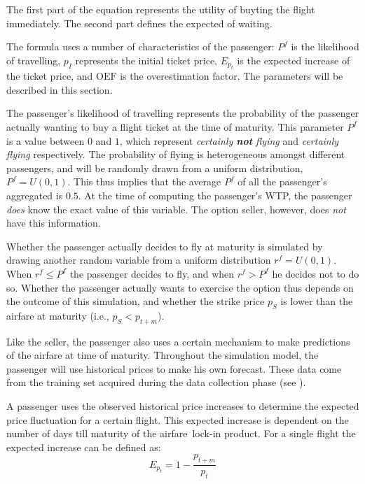 The first part of the equation represents the utility of buyting the flight immediately. The second part defines the expected of waiting.

The formula uses a number of characteristics of the passenger: $P^f$ is the likelihood of travelling, $p_I$ represents the initial ticket price, $E_{p_t}$ is the expected increase of the ticket price, and $\mbox{OEF}$ is the overestimation factor. The parameters will be described in this section.

The passenger's likelihood of travelling represents the probability of the passenger actually wanting to buy a flight ticket at the time of maturity. This parameter $P^f$ is a value between $0$ and $1$, which represent \emph{certainly \textbf{not} flying} and \emph{certainly flying} respectively. The probability of flying is heterogeneous amongst different passengers, and will be randomly drawn from a uniform distribution, $P^f = U(0,1)$. This thus implies that the average $P^f$ of all the passenger's aggregated is $0.5$. At the time of computing the passenger's WTP, the passenger \emph{does} know the exact value of this variable. The option seller, however, does \emph{not} have this information.

Whether the passenger actually decides to fly at maturity is simulated by drawing another random variable from a uniform distribution $r^f = U(0,1)$. When $r^f \le P^f$ the passenger decides to fly, and when $r^f > P^f$ he decides not to do so. Whether the passenger actually wants to exercise the option thus depends on the outcome of this simulation, and whether the strike price $p_S$ is lower than the airfare at maturity (i.e., $p_S < p_{t+m}$).

Like the seller, the passenger also uses a certain mechanism to make predictions of the airfare at time of maturity. Throughout the simulation model, the passenger will use historical prices to make his own forecast. These data come from the training set acquired during the data collection phase (see ).

A passenger uses the observed historical price increases to determine the expected price fluctuation for a certain flight. This expected increase is dependent on the number of days till maturity of the airfare~lock-in product. For a single flight the expected increase can be defined as:
$$E_{p_t} = 1 - \frac{p_{t+m}}{p_t}$$

